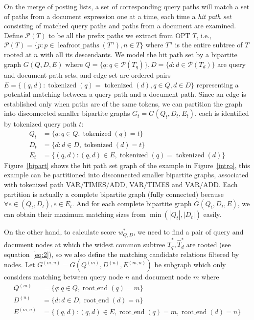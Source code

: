 \documentclass[runningheads]{llncs}
\begin{document}
On the merge of posting lists, a set of corresponding query paths will match a set of paths from a document expression one at a time, each time a \textit{hit path set} consisting of matched query paths and paths from a document are examined.
%
Define $\mathcal{P}(T)$ to be all the prefix paths we extract from OPT $T$, i.e.,
$\mathcal{P}(T) = \{p: p \in \operatorname{leafroot\_paths}(T^n), n \in T\}$ where $T^n$ is the entire subtree of $T$ rooted at $n$ with all its descendants.
%
We model the hit path set by a bipartite graph 
$G(Q, D, E)$ where $Q = \{q: q \in \mathcal{P}(T_q)\}, D = \{d: d \in \mathcal{P}(T_d)\}$ are query and document path sets, and edge set are ordered pairs $E = \{(q, d): \operatorname{tokenized}(q) =  \operatorname{tokenized}(d), q \in Q, d \in D\}$ representing a potential matching between a query path and a document path.
Since an edge is established only when paths are of the same tokens, we can partition the graph into disconnected smaller bipartite graphs $G_t = G(Q_t, D_t, E_t)$, each is identified by tokenized query path $t$:
$$
\begin{aligned}
Q_t &= \{ q: q \in Q, \operatorname{tokenized}(q) = t\} \\
D_t &= \{d: d \in D, \operatorname{tokenized}(d) = t \} \\
E_t &= \{(q, d): (q, d) \in E, \operatorname{tokenized}(q) = \operatorname{tokenized}(d) \}
\end{aligned}
$$
Figure~\ref{bipart} shows the hit path set graph of the example in Figure~\ref{intro}, this example can be partitioned into disconnected smaller bipartite graphs, associated with tokenized path VAR/TIMES/ADD, VAR/TIMES and VAR/ADD.
Each partition is actually a complete bipartite graph (fully connected) because $\forall e \in (Q_t, D_t), e \in E_t$.
And for each complete bipartite graph $G(Q_t, D_t, E)$, we can obtain their maximum matching sizes from $\min(|Q_t|, |D_t|)$ easily.

On the other hand, to calculate score $w^*_{Q, D}$, we need to find a pair of query and document nodes at which the widest common subtree $\hat{T}^*_q, \hat{T}^*_d$ are rooted (see equation~\ref{eq:2}), so we also define the matching candidate relations filtered by nodes.
Let $G^{(m, n)} = G(Q^{(m)}, D^{(n)}, E^{(m, n)})$ be subgraph which only considers matching between query node $n$ and document node $m$  where
$$
\begin{aligned}
Q^{(m)} &= \{ q: q \in Q, \operatorname{root\_end}(q) = m\} \\
D^{(n)} &= \{d: d \in D, \operatorname{root\_end}(d) = n\} \\
E^{(m, n)} &= \{(q, d): (q, d) \in E, \operatorname{root\_end}(q) = m, \operatorname{root\_end}(d) = n\} 
\end{aligned}
$$
\end{document}
